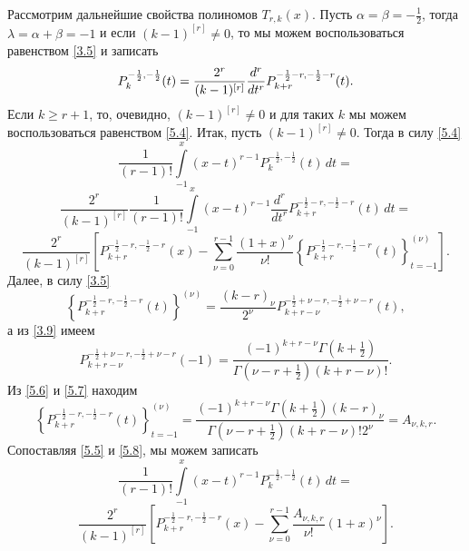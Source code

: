  Рассмотрим дальнейшие свойства полиномов $T_{r,k}(x)$.
Пусть $\alpha=\beta=-\frac{1}{2}$, тогда $\lambda=\alpha+\beta=-1$ и если $(k-1)^{[r]}\neq0$, то мы можем воспользоваться равенством \eqref{3.5} и записать
\begin{equation}\label{5.4}
P^{-\frac{1}{2},-\frac{1}{2}}_k(t)={2^r \over (k-1 )^{[r]}}\frac{d^r}{dt^r}P_{k+r}^{-\frac{1}{2}-r,-\frac{1}{2}-r}(t).
\end{equation}
 Если  $k\ge r+1$, то, очевидно, $(k-1)^{[r]}\neq0$ и для таких $k$ мы
можем  воспользоваться равенством \eqref{5.4}. Итак, пусть $(k-1)^{[r]}\neq0$. Тогда в силу  \eqref{5.4}
$$
\frac{1}{(r-1)!}\int\limits^x_{-1}(x-t)^{r-1}P_k^{-\frac{1}{2},-\frac{1}{2}}(t)\,dt=
$$
$$
\frac{2^r}{(k-1)^{[r]}}\frac{1}{(r-1)!}\int\limits^x_{-1}(x-t)^{r-1}
\frac{d^r}{dt^r}P_{k+r}^{-\frac{1}{2}-r,-\frac{1}{2}-r}(t)\,dt=
$$
\begin{equation}\label{5.5}
\frac{2^r}{(k-1)^{[r]}}\left[P_{k+r}^{-\frac{1}{2}-r,-\frac{1}{2}-r}(x)-\sum^{r-1}_{\nu=0}
\frac{(1+x)^\nu}{\nu!}\left\{P_{k+r}^{-\frac{1}{2}-r,-\frac{1}{2}-r}(t)
\right\}_{t=-1}^{(\nu)}\right].
\end{equation}
 Далее, в силу \eqref{3.5}
 \begin{equation}\label{5.6}
\left\{P_{k+r}^{-\frac{1}{2}-r,-\frac{1}{2}-r}(t)\right\}^{(\nu)}=
\frac{(k-r)_\nu}{2^\nu}P_{k+r-\nu}^{-\frac{1}{2}+\nu-r,-\frac{1}{2}+\nu-r}(t),
\end{equation}
а из \eqref{3.9} имеем
\begin{equation}\label{5.7}
P_{k+r-\nu}^{-\frac{1}{2}+\nu-r,-\frac{1}{2}+\nu-r}(-1)=\frac{(-1)^{k+r-\nu}\Gamma(k+\frac{1}{2})}{\Gamma(\nu-r+\frac{1}{2})(k+r-\nu)!}.
\end{equation}
Из \eqref{5.6}  и \eqref{5.7} находим
\begin{equation}\label{5.8}
\left\{P_{k+r}^{-\frac{1}{2}-r,-\frac{1}{2}-r}(t)\right\}_{t=-1}^{(\nu)}=
\frac{(-1)^{k+r-\nu}\Gamma(k+\frac{1}{2})(k-r)_{\nu}}
{\Gamma(\nu-r+\frac{1}{2})(k+r-\nu)!2^\nu}=A_{\nu,k,r}.
\end{equation}
Сопоставляя \eqref{5.5} и \eqref{5.8}, мы можем записать
$$\frac{1}{(r-1)!}\int\limits^x_{-1}(x-t)^{r-1}P_k^{-\frac{1}{2},-\frac{1}{2}}(t)\,dt=$$
\begin{equation}\label{5.9}
\frac{2^r}{(k-1)^{[r]}}\left[P_{k+r}^{-\frac{1}{2}-r,-\frac{1}{2}-r}(x)-\sum^{r-1}_{\nu=0}
\frac{A_{\nu,k,r}}{\nu!}(1+x)^{\nu}\right].
\end{equation}




